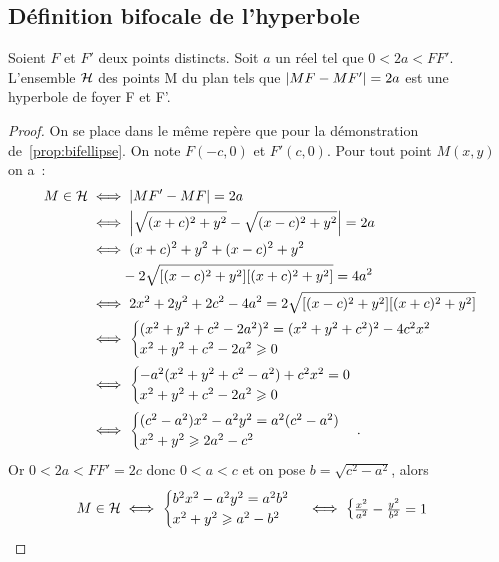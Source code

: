 \subsection{Définition bifocale de l'hyperbole}
\begin{prop}
  Soient \(F\) et \(F'\) deux points distincts. Soit \(a\) un réel tel que 
  \(0<2a<FF'\). L'ensemble \(\mathcal{H}\) des points M du plan tels que 
  \(\left\lvert MF-MF'\right\rvert = 2a\) est une hyperbole de foyer F et F'.
\end{prop}
\begin{proof}
  On se place dans le même repère que pour la démonstration 
  de~\ref{prop:bifellipse}. On note \(F(-c, 0)\) et \(F'(c, 0)\). Pour tout 
  point \(M(x, y)\)  on a~:
  \begin{align}
    M \in \mathcal{H} & \iff \left\lvert MF'-MF\right\rvert = 2a \\
             & \iff \left\lvert\sqrt{(x + c)^2 + y^2}-\sqrt{(x-c)^2 + y^2}\right\rvert = 2a \\
             & \iff (x + c)^2 +y^2 + (x-c)^2 + y^2 \notag \\ & \phantom{\iff} 
             -2\sqrt{[(x-c)^2 + y^2][(x + c)^2 + y^2]} = 4a^2\\
             & \iff 2x^2 + 2y^2 + 2c^2-4a^2 = 2\sqrt{[(x-c)^2 + y^2][(x + c)^2 + y^2]}\\
             & \iff \begin{cases}(x^2 + y^2 + c^2-2a^2)^2 = (x^2 + y^2 + c^2)^2-4c^2x^2 
             \\ x^2 + y^2 + c^2-2a^2 \geqslant 0\end{cases}\\
             & \iff \begin{cases}-a^2(x^2 + y^2 + c^2-a^2) + c^2x^2 = 0 \\ 
             x^2 + y^2 + c^2-2a^2 \geqslant 0\end{cases}\\
             & \iff \begin{cases}(c^2-a^2)x^2 - a^2y^2 = a^2(c^2-a^2) \\ x^2 + y^2 
             \geqslant 2a^2-c^2\end{cases}.
  \end{align}
  Or \(0<2a<FF' = 2c\) donc \(0<a<c\) et on pose \(b = \sqrt{c^2-a^2}\), alors
  \begin{equation}
    M \in \mathcal{H} \iff \begin{cases}b^2x^2 - a^2y^2 = a^2b^2 \\ x^2 + y^2 \geqslant 
      a^2-b^2\end{cases}\iff\begin{cases}\frac{x^2}{a^2} - \frac{y^2}{b^2} = 1 

\end{cases}
\end{equation}
\end{proof}
